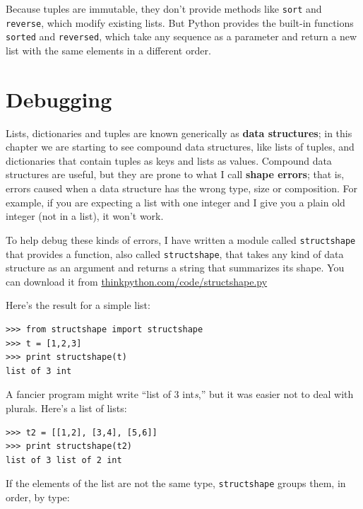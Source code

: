 \documentclass[10pt]{book}
\begin{document}
Because tuples are immutable, they don't provide methods
like {\tt sort} and {\tt reverse}, which modify existing lists.
But Python provides the built-in functions {\tt sorted}
and {\tt reversed}, which take any sequence as a parameter
and return a new list with the same elements in a different
order.



\section{Debugging}


Lists, dictionaries and tuples are known generically as {\bf data
  structures}; in this chapter we are starting to see compound data
structures, like lists of tuples, and dictionaries that contain tuples
as keys and lists as values.  Compound data structures are useful, but
they are prone to what I call {\bf shape errors}; that is, errors
caused when a data structure has the wrong type, size or composition.
For example, if you are expecting a list with one integer and I
give you a plain old integer (not in a list), it won't work.


To help debug these kinds of errors, I have written a module
called {\tt structshape} that provides a function, also called
{\tt structshape}, that takes any kind of data structure as
an argument and returns a string that summarizes its shape.
You can download it from \url{thinkpython.com/code/structshape.py}

Here's the result for a simple list:

\beforeverb
\begin{verbatim}
>>> from structshape import structshape
>>> t = [1,2,3]
>>> print structshape(t)
list of 3 int
\end{verbatim}
\afterverb
%
A fancier program might write ``list of 3 int{\em s},'' but it
was easier not to deal with plurals.  Here's a list of lists:

\beforeverb
\begin{verbatim}
>>> t2 = [[1,2], [3,4], [5,6]]
>>> print structshape(t2)
list of 3 list of 2 int
\end{verbatim}
\afterverb
%
If the elements of the list are not the same type,
{\tt structshape} groups them, in order, by type:
\end{document}
